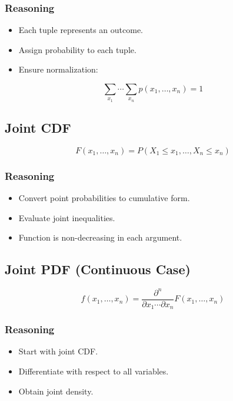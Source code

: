 \documentclass[12pt]{article}
\begin{document}
\subsubsection*{Reasoning}

\begin{itemize}
\item Each tuple represents an outcome.
\item Assign probability to each tuple.
\item Ensure normalization:
\end{itemize}

\[
\sum_{x_1} \cdots \sum_{x_n} p(x_1,\dots,x_n) = 1
\]

\subsection{Joint CDF}

\[
F(x_1,\dots,x_n) =
P(X_1 \le x_1, \dots, X_n \le x_n)
\]

\subsubsection*{Reasoning}

\begin{itemize}
\item Convert point probabilities to cumulative form.
\item Evaluate joint inequalities.
\item Function is non-decreasing in each argument.
\end{itemize}

\subsection{Joint PDF (Continuous Case)}

\[
f(x_1,\dots,x_n) =
\frac{\partial^n}{\partial x_1 \cdots \partial x_n}
F(x_1,\dots,x_n)
\]

\subsubsection*{Reasoning}

\begin{itemize}
\item Start with joint CDF.
\item Differentiate with respect to all variables.
\item Obtain joint density.
\end{itemize}
\end{document}
